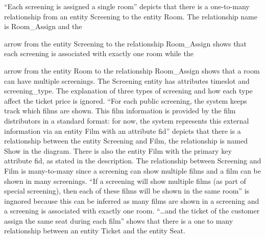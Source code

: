 \documentclass{article}
\begin{document}
``Each screening is assigned a single room'' depicts that there is a one-to-many
relationship from an entity Screening to the entity Room. The relationship name
is Room\_Assign and the
arrow from the entity Screening to the relationship Room\_Assign shows that each
screening is associated with exactly one room while the
arrow from the entity Room to the relationship Room\_Assign shows that a room
can have multiple screenings. The Screening entity has attributes timeslot and
screening\_type. The explanation of three types of screening and how each type
affect the ticket price is ignored. ``For each public screening, the system keeps
track which films are shown. This film information is provided by the film
distributors in a standard format: for now, the system represents this external
information via an entity Film with an attribute fid'' depicts that there is a
relationship between the entity Screening and Film, the relationship is named
Show in the diagram. There is also the entity Film with the primary key attribute
fid, as stated in the description. The relationship between Screening and Film
is many-to-many since a screening can show multiple films and a film can be shown
in many screenings. ``If a screening will show multiple films (as part of special
screening), then each of these films will be shown in the same room'' is ingnored
because this can be inferred as many films are shown in a screening and a
screening is associated with exactly one room. ``\dots and the ticket of the
customer assign the same seat during each film'' shows that there is a one to
many relationship between an entity Ticket and the entity Seat.
\end{document}
